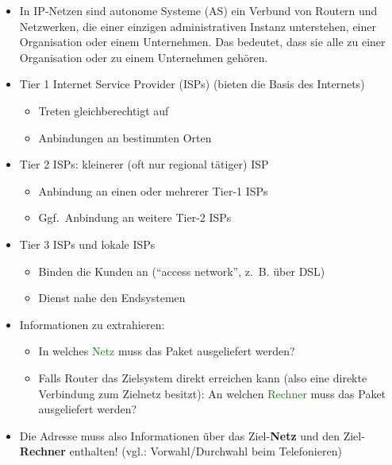 
\begin{itemize}
    \item In IP-Netzen sind autonome Systeme (AS) ein Verbund von Routern und Netzwerken, die einer einzigen administrativen Instanz unterstehen, einer Organisation oder einem Unternehmen.
    Das bedeutet, dass sie alle zu einer Organisation oder zu einem Unternehmen gehören.
\end{itemize}

\begin{itemize}
    \item Tier 1 Internet Service Provider (ISPs) (bieten die Basis des Internets)
    \begin{itemize}
        \item Treten gleichberechtigt auf
        \item Anbindungen an bestimmten Orten
    \end{itemize}
    \item Tier 2 ISPs: kleinerer (oft nur regional tätiger) ISP
    \begin{itemize}
        \item Anbindung an einen oder mehrerer Tier-1 ISPs
        \item Ggf.\ Anbindung an weitere Tier-2 ISPs
    \end{itemize}
    \item Tier 3 ISPs und lokale ISPs
    \begin{itemize}
        \item Binden die Kunden an (“access network”, z.\ B. über DSL)
        \item Dienst nahe den Endsystemen
    \end{itemize}
\end{itemize}

\begin{itemize}
    \item Informationen zu extrahieren:
    \begin{itemize}
        \item In welches \textcolor{green}{Netz} muss das Paket ausgeliefert werden?
        \item Falls Router das Zielsystem direkt erreichen kann (also eine direkte Verbindung zum Zielnetz besitzt): An welchen \textcolor{green}{Rechner} muss das Paket ausgeliefert werden?
    \end{itemize}
    \item Die Adresse muss also Informationen über das Ziel-\textbf{Netz} und den Ziel-\textbf{Rechner} enthalten! (vgl.: Vorwahl/Durchwahl beim Telefonieren)
\end{itemize}

